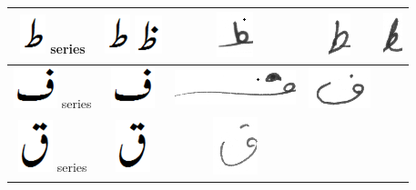 \documentclass[a4paper,conference]{IEEEtran}
\begin{document}
\begin{table}[h]
\begin{tabular}{@{}ccccc@{}}
\hline
\includegraphics[scale=0.25]{tuay_orig} series & \includegraphics[scale=0.25]{tuay_orig} \includegraphics[scale=0.25]{zuay} & \includegraphics[scale=0.25]{tuin} &
\includegraphics[scale=0.20]{tuin2} & 
\includegraphics[scale=0.20]{zuin}\\ 
\hline
\includegraphics[scale=0.20]{Fay_orig} series & \includegraphics[scale=0.20]{Fay_orig} & \includegraphics[scale=0.25]{22} &
\includegraphics[scale=0.20]{23} & \\ 
\hline
\includegraphics[scale=0.25]{qaaf_orig} series & \includegraphics[scale=0.25]{qaaf_orig} & \includegraphics[scale=0.20]{24} &

\end{tabular}
\end{table}
\end{document}
